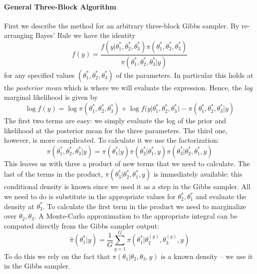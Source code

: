 \documentclass[12pt]{article}
\begin{document}
\paragraph{General Three-Block Algorithm} First we describe the method for an arbitrary three-block Gibbs sampler. 
By re-arranging Bayes' Rule we have the identity
\begin{equation*}
  f(y) = \frac{f(y|\theta_1^*, \theta^*_2, \theta_3^*)\pi\left( \theta^*_1, \theta^*_2, \theta^*_3 \right)}{\pi\left( \theta_1^*, \theta_2^*, \theta_3^*|y \right)}
\end{equation*}
for any specified values $(\theta_1^*, \theta_2^*, \theta_3^*)$ of the parameters.
In particular this holds at the \emph{posterior mean} which is where we will evaluate the expression.
Hence, the \emph{log} marginal likelihood is given by
\begin{equation*}
  \log{f(y)} =  \log \pi\left( \theta^*_1, \theta^*_2, \theta^*_3 \right) + \log{f(y|\theta^*_1, \theta^*_2, \theta^*_3}) - \pi\left( \theta^*_1, \theta^*_2, \theta^*_3|y \right)
\end{equation*}
The first two terms are easy: we simply evaluate the log of the prior and likelihood at the posterior mean for the three parameters.
The third one, however, is more complicated.
To calculate it we use the factorization:
\begin{equation*}
\pi\left( \theta^*_1, \theta^*_2, \theta^*_3|y \right) = \pi(\theta^*_1|y) \pi\left( \theta^*_2|\theta^*_1,y \right)\pi\left( \theta^*_3|\theta^*_2, \theta^*_1,y \right)
\end{equation*}
This leaves us with three a product of new terms that we need to calculate.
The last of the terms in the product, $\pi(\theta^*_3|\theta^*_2, \theta^*_1, y)$ is immediately available: this conditional density is known since we used it as a step in the Gibbs sampler.
All we need to do is substitute in the appropriate values for $\theta^*_2,\theta^*_1$ and evaluate the density at $\theta^*_3$.
To calculate the first term in the product we need to marginalize over $\theta_2, \theta_3$.
A Monte-Carlo approximation to the appropriate integral can be computed directly from the Gibbs sampler output:
\begin{equation*}
  \widehat{\pi}\left( \theta^*_1|y \right) = \frac{1}{G}\sum_{g=1}^{G} \pi\left( \theta^*_1|\theta_2^{(g)}, \theta_3^{(g)}, y \right)
\end{equation*}
To do this we rely on the fact that $\pi(\theta_1|\theta_2, \theta_3, y)$ is a known density -- we use it in the Gibbs sampler.
\end{document}

